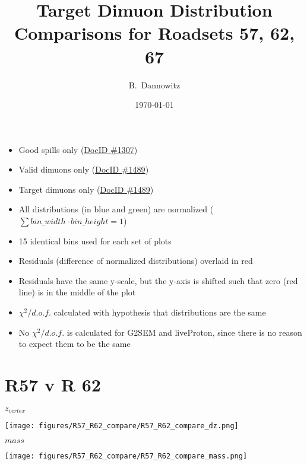 \documentclass{beamer}
\title[Distribution Comparisons: R57 v R62 v R67]{Target Dimuon Distribution Comparisons for Roadsets 57, 62, 67}
\subtitle{}
\author[Bryan Dannowitz]
{B.~Dannowitz}
\institute{University of Illinois at Urbana-Champaign}
\date{\today}
\begin{document}
\begin{frame}
  \titlepage
\end{frame}

\begin{frame}
	\begin{itemize}
		\item Good spills only (\href{http://seaquest-docdb.fnal.gov:8080/cgi-bin/ShowDocument?docid=1307}{DocID \#1307})
		\item Valid dimuons only (\href{http://seaquest-docdb.fnal.gov:8080/cgi-bin/ShowDocument?docid=1489}{DocID \#1489})
		\item Target dimuons only (\href{http://seaquest-docdb.fnal.gov:8080/cgi-bin/ShowDocument?docid=1489}{DocID \#1489})
		\item All distributions (in blue and green) are normalized ($\sum bin\_width \cdot bin\_height = 1$)
		\item 15 identical bins used for each set of plots
		\item Residuals (difference of normalized distributions) overlaid in red
		\item Residuals have the same y-scale, but the y-axis is shifted such that zero (red line) is in the middle of the plot
		\item $\chi^2/d.o.f.$ calculated with hypothesis that distributions are the same
		\item No $\chi^2/d.o.f.$ is calculated for G2SEM and liveProton, since there is no reason to expect them to be the same
	\end{itemize}
\end{frame}

\section{R57 v R 62}

\begin{frame}{$z_{vertex}$}
	\begin{center}
		\texttt{[image: figures/R57\_R62\_compare/R57\_R62\_compare\_dz.png]}
	\end{center}
\end{frame}

\begin{frame}{$mass$}
	\begin{center}
		\texttt{[image: figures/R57\_R62\_compare/R57\_R62\_compare\_mass.png]}
	\end{center}
\end{frame}
\end{document}
